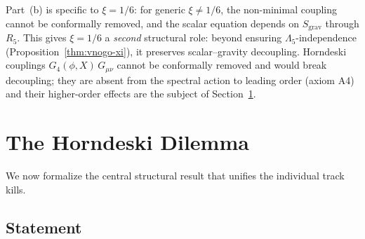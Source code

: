 \begin{remark}
\label{rem:3-beyond-minimal}
Part~(b) is specific to $\xi = 1/6$: for generic $\xi \neq 1/6$, the non-minimal coupling cannot be conformally removed, and the scalar equation depends on $S_{\mathrm{grav}}$ through $R_5$. This gives $\xi = 1/6$ a \emph{second} structural role: beyond ensuring $\Lambda_5$-independence (Proposition~\ref{thm:vnogo-xi}), it preserves scalar--gravity decoupling. Horndeski couplings $G_4(\phi, X)\,G_{\mu\nu}$ cannot be conformally removed and would break decoupling; they are absent from the spectral action to leading order (axiom A4) and their higher-order effects are the subject of Section~\ref{sec:3-horndeski}.
\end{remark}

\section{The Horndeski Dilemma}
\label{sec:3-horndeski}

We now formalize the central structural result that unifies the individual track kills.

\subsection{Statement}
\label{sec:3-horndeski-statement}

